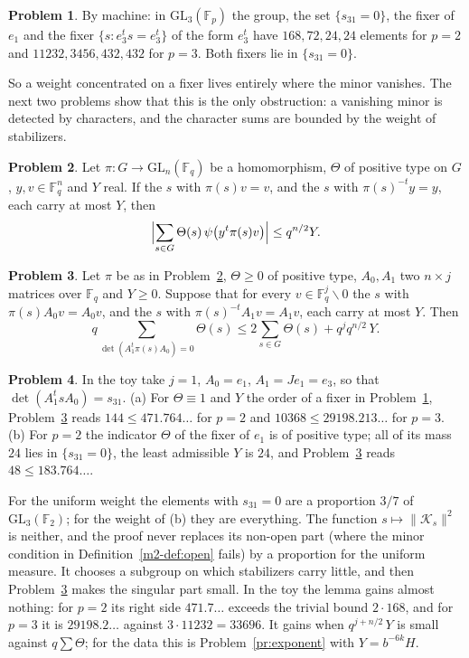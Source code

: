 \documentclass[reqno]{amsart}
\theoremstyle{definition}
\newtheorem{problem}{Problem}[section]
\theoremstyle{plain}
\theoremstyle{remark}
\newcommand{\F}{\mathbb{F}}
\newcommand{\GL}{\mathrm{GL}}
\newcommand{\Kc}{\mathcal K}
\begin{document}
\begin{problem}\label{pr:gl3-counts}
By machine: in \(\GL_3(\F_p)\) the group, the set \(\{s_{31}=0\}\), the fixer of \(e_1\) and the fixer \(\{s:e_3^ts=e_3^t\}\) of the form \(e_3^t\) have \(168, 72, 24, 24\) elements for \(p=2\) and \(11232, 3456, 432, 432\) for \(p=3\).  Both fixers lie in \(\{s_{31}=0\}\).
\end{problem}

So a weight concentrated on a fixer lives entirely where the minor vanishes.  The next two problems show that this is the only obstruction: a vanishing minor is detected by characters, and the character sums are bounded by the weight of stabilizers.

\begin{problem}\label{pr:character-sum}
Let \(\pi\colon G\to\GL_n(\F_q)\) be a homomorphism, \(\Theta\) of positive type on \(G\), \(y,v\in\F_q^n\) and \(Y\) real.  If the \(s\) with \(\pi(s)v=v\), and the \(s\) with \(\pi(s)^{-t}y=y\), each carry at most \(Y\), then
\[
 \Bigl\lvert\sum_{s\in G}\Theta(s)\,\psi\bigl(y^t\pi(s)v\bigr)\Bigr\rvert\le q^{n/2}Y .
\]
\end{problem}

\begin{problem}\label{pr:det-lemma}
Let \(\pi\) be as in Problem~\ref{pr:character-sum}, \(\Theta\ge0\) of positive type, \(A_0,A_1\) two \(n\times j\) matrices over \(\F_q\) and \(Y\ge0\).  Suppose that for every \(v\in\F_q^j\smallsetminus0\) the \(s\) with \(\pi(s)A_0v=A_0v\), and the \(s\) with \(\pi(s)^{-t}A_1v=A_1v\), each carry at most \(Y\).  Then
\[
 q\sum_{\det(A_1^t\pi(s)A_0)=0}\Theta(s)\le2\sum_{s\in G}\Theta(s)+q^{j}q^{n/2}\,Y .
\]
\end{problem}

\begin{problem}\label{pr:det-toy}
In the toy take \(j=1\), \(A_0=e_1\), \(A_1=Je_1=e_3\), so that \(\det(A_1^tsA_0)=s_{31}\).  (a) For \(\Theta\equiv1\) and \(Y\) the order of a fixer in Problem~\ref{pr:gl3-counts}, Problem~\ref{pr:det-lemma} reads \(144\le471.764\ldots\) for \(p=2\) and \(10368\le29198.213\ldots\) for \(p=3\).  (b) For \(p=2\) the indicator \(\Theta\) of the fixer of \(e_1\) is of positive type; all of its mass \(24\) lies in \(\{s_{31}=0\}\), the least admissible \(Y\) is \(24\), and Problem~\ref{pr:det-lemma} reads \(48\le183.764\ldots\).
\end{problem}

For the uniform weight the elements with \(s_{31}=0\) are a proportion \(3/7\) of \(\GL_3(\F_2)\); for the weight of (b) they are everything.  The function \(s\mapsto\lVert\Kc_s\rVert^2\) is neither, and the proof never replaces its non-open part (where the minor condition in Definition~\ref{m2-def:open} fails) by a proportion for the uniform measure.  It chooses a subgroup on which stabilizers carry little, and then Problem~\ref{pr:det-lemma} makes the singular part small.  In the toy the lemma gains almost nothing: for \(p=2\) its right side \(471.7\ldots\) exceeds the trivial bound \(2\cdot168\), and for \(p=3\) it is \(29198.2\ldots\) against \(3\cdot11232=33696\).  It gains when \(q^{j+n/2}\,Y\) is small against \(q\sum\Theta\); for the data this is Problem~\ref{pr:exponent} with \(Y=b^{-6k}H\).
\end{document}
